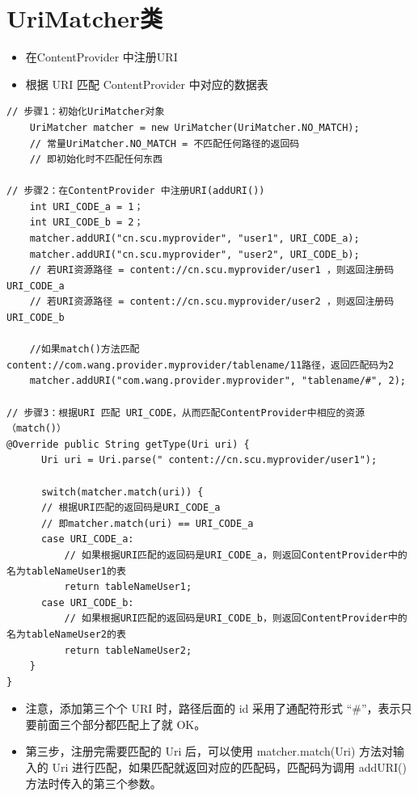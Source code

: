 \documentclass[9pt, b5paaper]{book}
\begin{document}
\section{UriMatcher类}
\label{sec-5-6}
\begin{itemize}
\item 在ContentProvider 中注册URI
\item 根据 URI 匹配 ContentProvider 中对应的数据表
\end{itemize}
\begin{verbatim}
// 步骤1：初始化UriMatcher对象
    UriMatcher matcher = new UriMatcher(UriMatcher.NO_MATCH); 
    // 常量UriMatcher.NO_MATCH = 不匹配任何路径的返回码
    // 即初始化时不匹配任何东西

// 步骤2：在ContentProvider 中注册URI(addURI())
    int URI_CODE_a = 1；
    int URI_CODE_b = 2；
    matcher.addURI("cn.scu.myprovider", "user1", URI_CODE_a); 
    matcher.addURI("cn.scu.myprovider", "user2", URI_CODE_b); 
    // 若URI资源路径 = content://cn.scu.myprovider/user1 ，则返回注册码URI_CODE_a
    // 若URI资源路径 = content://cn.scu.myprovider/user2 ，则返回注册码URI_CODE_b

    //如果match()方法匹配content://com.wang.provider.myprovider/tablename/11路径，返回匹配码为2
    matcher.addURI("com.wang.provider.myprovider", "tablename/#", 2);

// 步骤3：根据URI 匹配 URI_CODE，从而匹配ContentProvider中相应的资源（match()）
@Override public String getType(Uri uri) {   
      Uri uri = Uri.parse(" content://cn.scu.myprovider/user1");   

      switch(matcher.match(uri)) {   
      // 根据URI匹配的返回码是URI_CODE_a
      // 即matcher.match(uri) == URI_CODE_a
      case URI_CODE_a:   
          // 如果根据URI匹配的返回码是URI_CODE_a，则返回ContentProvider中的名为tableNameUser1的表
          return tableNameUser1;   
      case URI_CODE_b:   
          // 如果根据URI匹配的返回码是URI_CODE_b，则返回ContentProvider中的名为tableNameUser2的表
          return tableNameUser2;
    }   
}
\end{verbatim}
\begin{itemize}
\item 注意，添加第三个个 URI 时，路径后面的 id 采用了通配符形式 “\#”，表示只要前面三个部分都匹配上了就 OK。
\item 第三步，注册完需要匹配的 Uri 后，可以使用 matcher.match(Uri) 方法对输入的 Uri 进行匹配，如果匹配就返回对应的匹配码，匹配码为调用 addURI() 方法时传入的第三个参数。
\end{itemize}
\end{document}
